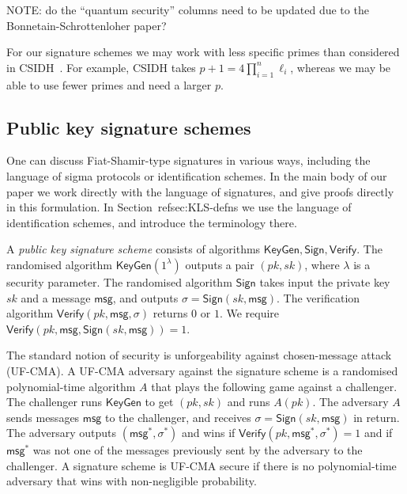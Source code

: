 \documentclass{llncs}
\newcommand{\msg}{\textsf{msg}}
\newcommand{\KeyGen}{\textsf{KeyGen}}
\newcommand{\Sign}{\textsf{Sign}}
\newcommand{\Verify}{\textsf{Verify}}
\begin{document}
NOTE: do the ``quantum security'' columns need to be updated due to the Bonnetain-Schrottenloher paper?



For our signature schemes we may work with less specific primes than considered in CSIDH~\cite{CLMPR18}. For example, CSIDH takes $p+1 = 4\prod_{i=1}^n\ell_i$, whereas we may be able to use fewer primes and need a larger $p$.




\subsection{Public key signature schemes}

One can discuss Fiat-Shamir-type signatures in various ways, including the language of sigma protocols or identification schemes.
In the main body of our paper we work directly with the language of signatures, and give proofs directly in this formulation.
In Section~ref{sec:KLS-defns} we use the language of identification schemes, and introduce the terminology there.


A \emph{public key signature scheme} consists of algorithms $\KeyGen, \Sign, \Verify$.
The randomised algorithm $\KeyGen( 1^\lambda )$ outputs a pair $(pk,sk)$, where $\lambda$ is a security parameter.
The randomised algorithm $\Sign$ takes input the private key $sk$ and a message $\msg$, and  outputs $\sigma = \Sign( sk, \msg )$.
The verification algorithm $\Verify( pk, \msg, \sigma )$ returns $0$ or $1$.
We require $\Verify( pk, \msg, \Sign( sk, \msg )) = 1$.


The standard notion of security is unforgeability against chosen-message attack (UF-CMA).
A UF-CMA adversary against the signature scheme is a randomised polynomial-time algorithm $A$ that plays the following game against a challenger.
The challenger runs $\KeyGen$ to get $(pk,sk)$ and runs $A( pk )$.
The adversary $A$ sends messages $\msg$ to the challenger, and receives $\sigma = \Sign(sk, \msg)$ in return.
The adversary outputs $(\msg^*, \sigma^*)$ and wins if $\Verify( pk, \msg^*, \sigma^* ) = 1$ and if $\msg^*$ was not one of the messages previously sent by the adversary to the challenger.
A signature scheme is UF-CMA secure if there is no polynomial-time adversary that wins with non-negligible probability.



\end{document}
